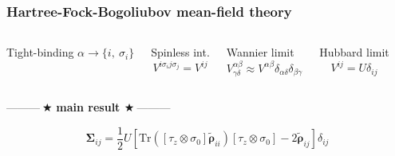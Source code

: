\documentclass{beamer}
\begin{document}
\begin{frame}[noframenumbering]
\frametitle{Hartree-Fock-Bogoliubov mean-field theory}

\vspace*{-0.5cm}
\begin{columns}
\column{2.5cm}
\begin{exampleblock}{Tight-binding}
$\alpha\rightarrow \{i,\ \sigma_{i}\}$
\end{exampleblock}

\column{2.5cm}
\begin{exampleblock}{Spinless int.}
\vspace*{-4mm}
\begin{equation*}
V^{i\sigma_{i}j\sigma_{j}}=V^{ij}
\end{equation*}
\end{exampleblock}

\column{3cm}
\begin{alertblock}{Wannier limit}
\vspace*{-4mm}
\begin{equation*}
V_{\gamma\delta}^{\alpha\beta}\approx V^{\alpha\beta}\delta_{\alpha\delta}\delta_{\beta\gamma}
\end{equation*}
\end{alertblock}

\column{2.5cm}
\begin{alertblock}{Hubbard limit}
\vspace*{-4mm}
\begin{equation*}
V^{ij}=U\delta_{ij}
\end{equation*}
\end{alertblock}
\end{columns}

\pause
\vspace*{0.5cm}
\begin{center}
\Large \textcolor{red!80!black}{---------$\ \bigstar$ \textbf{main result $\bigstar\ $}---------}
\end{center}

\begin{block}{}
\begin{equation*}
\boldsymbol{\Sigma}_{ij}=\frac{1}{2}U\left[\text{Tr}\left(\left[\tau_{z}\otimes\sigma_{0}\right]\tilde{\boldsymbol{\rho}}_{ii}\right)\left[\tau_{z}\otimes\sigma_{0}\right]-2\tilde{\boldsymbol{\rho}}_{ij}\right]\delta_{ij}
\end{equation*}
\end{block}


\end{frame}
\end{document}
